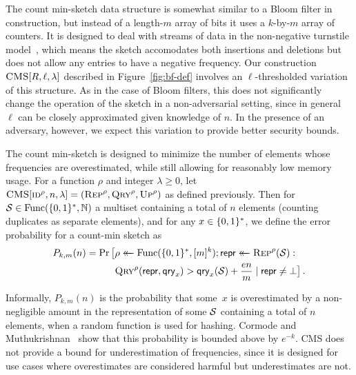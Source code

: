 The count min-sketch data structure is somewhat similar to a Bloom filter in
construction, but instead of a length-$m$ array of bits it uses a $k$-by-$m$
array of counters. It is designed to deal with streams of data in the
non-negative turnstile model~\cite{cormode2005improved}, which means the sketch
accomodates both insertions and deletions but does not allow any entries to have
a negative frequency. Our construction $\textnormal{\textsc{CMS}}[R,\ell,\lambda]$ described in
Figure~\ref{fig:bf-def} involves an $\ell$-thresholded variation of this
structure. As in the case of Bloom filters, this does not significantly change
the operation of the sketch in a non-adversarial setting, since in general
$\ell$ can be closely approximated given knowledge of $n$. In the presence of an
adversary, however, we expect this variation to provide better security bounds.

%
The count min-sketch is designed to minimize the number of elements whose
frequencies are overestimated, while still allowing for reasonably low memory
usage. For a function $\rho$ and integer $\lambda\ge0$, let
$\textnormal{\textsc{CMS}}[\textnormal{\textsc{id}}^\rho,n,\lambda] = (\textnormal{\textsc{Rep}}^\rho,\textnormal{\textsc{Qry}}^\rho,\textnormal{\textsc{Up}}^\rho)$ as defined
previously. Then for $\mathcal{S} \in \mathrm{Func}(\{0,1\}^*,\mathbb{N})$  a multiset containing a total
of $n$ elements (counting duplicates as separate elements), and for any
$x \in \{0,1\}^*$, we define the error probability for a count-min sketch as
\begin{equation}\label{eq:bf-fp}
  \begin{aligned}
    P_{k,m}(n) =
      \Pr\big[&\rho \mathrel{\leftarrow\mkern-14mu\leftarrow} \mathrm{Func}(\{0,1\}^*,[m]^k);
              \mathsf{repr} \mathrel{\leftarrow\mkern-14mu\leftarrow} \textnormal{\textsc{Rep}}^\rho(\mathcal{S}): \\
              &\textnormal{\textsc{Qry}}^\rho(\mathsf{repr}, \mathsf{qry}_x) > \mathsf{qry}_x(\mathcal{S})+\frac{en}{m} \mid \mathsf{repr} \ne \bot
      \big] \,.
  \end{aligned}
\end{equation}


Informally, $P_{k,m}(n)$ is the probability that some~$x$ is overestimated by a
non-negligible amount in the representation of some $\mathcal{S}$ containing a total
of $n$ elements, when a random function is used for hashing. Cormode and
Muthukrishnan~\cite{cormode2005improved} show that this probability is bounded
above by $e^{-k}$. CMS does not provide a bound for underestimation of
frequencies, since it is designed for use cases where overestimates are
considered harmful but underestimates are not.

